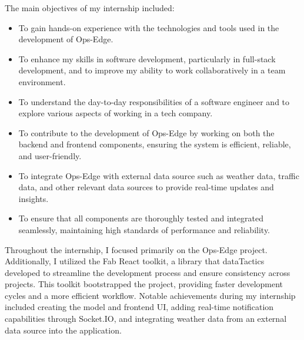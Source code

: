The main objectives of my internship included:

\begin{itemize}
    \item To gain hands-on experience with the technologies and tools used in the development of Ops-Edge.
    \item To enhance my skills in software development, particularly in full-stack development, and to improve my ability to work collaboratively in a team environment.
    \item To understand the day-to-day responsibilities of a software engineer and to explore various aspects of working in a tech company.
    \item To contribute to the development of Ops-Edge by working on both the backend and frontend components, ensuring the system is efficient, reliable, and user-friendly.
    \item To integrate Ops-Edge with external data source such as weather data, traffic data, and other relevant data sources to provide real-time updates and insights.
    \item To ensure that all components are thoroughly tested and integrated seamlessly, maintaining high standards of performance and reliability.
\end{itemize}

Throughout the internship, I focused primarily on the Ops-Edge project. Additionally, I utilized the Fab React toolkit, a library that dataTactics developed to streamline the development process and ensure consistency across projects. This toolkit bootstrapped the project, providing faster development cycles and a more efficient workflow. Notable achievements during my internship included creating the model and frontend UI, adding real-time notification capabilities through Socket.IO, and integrating weather data from an external data source into the application.